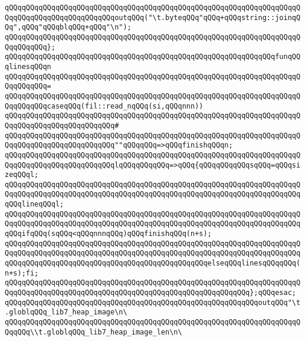 \verb|qQQqqQQqqQQqqQQqqQQqqQQqqQQqqQQqqQQqqQQqqQQqqQQqqQQqqQQqqQQqqQQqqQQqqQQqqQQqqQQqqQQqqQQqqQQqqQQqoutqQQq("\t.byteqQQq"qQQq+qQQqstring::joinqQQq",qQQq"qQQqblqQQq+qQQq"\n");|\newline
\verb|qQQqqQQqqQQqqQQqqQQqqQQqqQQqqQQqqQQqqQQqqQQqqQQqqQQqqQQqqQQqqQQqqQQqqQQqqQQqqQQq};|\newline
\newline
\verb|qQQqqQQqqQQqqQQqqQQqqQQqqQQqqQQqqQQqqQQqqQQqqQQqqQQqqQQqqQQqqQQqfunqQQqlinesqQQqn|\newline
\verb|qQQqqQQqqQQqqQQqqQQqqQQqqQQqqQQqqQQqqQQqqQQqqQQqqQQqqQQqqQQqqQQqqQQqqQQqqQQqqQQq=|\newline
\verb|qQQqqQQqqQQqqQQqqQQqqQQqqQQqqQQqqQQqqQQqqQQqqQQqqQQqqQQqqQQqqQQqqQQqqQQqqQQqqQQqcaseqQQq(fil::read_nqQQq(si,qQQqnnn))|\newline
\verb|qQQqqQQqqQQqqQQqqQQqqQQqqQQqqQQqqQQqqQQqqQQqqQQqqQQqqQQqqQQqqQQqqQQqqQQqqQQqqQQqqQQqqQQqqQQqqQQq#|\newline
\verb|qQQqqQQqqQQqqQQqqQQqqQQqqQQqqQQqqQQqqQQqqQQqqQQqqQQqqQQqqQQqqQQqqQQqqQQqqQQqqQQqqQQqqQQqqQQqqQQq""qQQqqQQq=>qQQqfinishqQQqn;|\newline
\newline
\verb|qQQqqQQqqQQqqQQqqQQqqQQqqQQqqQQqqQQqqQQqqQQqqQQqqQQqqQQqqQQqqQQqqQQqqQQqqQQqqQQqqQQqqQQqqQQqqQQqlqQQqqQQqqQQq=>qQQq{qQQqqQQqqQQqsqQQq=qQQqsizeqQQql;|\newline
\verb|qQQqqQQqqQQqqQQqqQQqqQQqqQQqqQQqqQQqqQQqqQQqqQQqqQQqqQQqqQQqqQQqqQQqqQQqqQQqqQQqqQQqqQQqqQQqqQQqqQQqqQQqqQQqqQQqqQQqqQQqqQQqqQQqqQQqqQQqqQQqqQQqlineqQQql;|\newline
\verb|qQQqqQQqqQQqqQQqqQQqqQQqqQQqqQQqqQQqqQQqqQQqqQQqqQQqqQQqqQQqqQQqqQQqqQQqqQQqqQQqqQQqqQQqqQQqqQQqqQQqqQQqqQQqqQQqqQQqqQQqqQQqqQQqqQQqqQQqqQQqqQQqifqQQq(sqQQq<qQQqnnnqQQq)qQQqfinishqQQq(n+s);|\newline
\verb|qQQqqQQqqQQqqQQqqQQqqQQqqQQqqQQqqQQqqQQqqQQqqQQqqQQqqQQqqQQqqQQqqQQqqQQqqQQqqQQqqQQqqQQqqQQqqQQqqQQqqQQqqQQqqQQqqQQqqQQqqQQqqQQqqQQqqQQqqQQqqQQqqQQqqQQqqQQqqQQqqQQqqQQqqQQqqQQqqQQqqQQqqQQqelseqQQqlinesqQQqqQQq(n+s);fi;|\newline
\verb|qQQqqQQqqQQqqQQqqQQqqQQqqQQqqQQqqQQqqQQqqQQqqQQqqQQqqQQqqQQqqQQqqQQqqQQqqQQqqQQqqQQqqQQqqQQqqQQqqQQqqQQqqQQqqQQqqQQqqQQqqQQqqQQq};qQQqesac;|\newline
\newline
\verb|qQQqqQQqqQQqqQQqqQQqqQQqqQQqqQQqqQQqqQQqqQQqqQQqqQQqqQQqqQQqoutqQQq"\t.globlqQQq_lib7_heap_image\n\|\newline
\verb|qQQqqQQqqQQqqQQqqQQqqQQqqQQqqQQqqQQqqQQqqQQqqQQqqQQqqQQqqQQqqQQqqQQqqQQqqQQq\\t.globlqQQq_lib7_heap_image_len\n\|\newline
